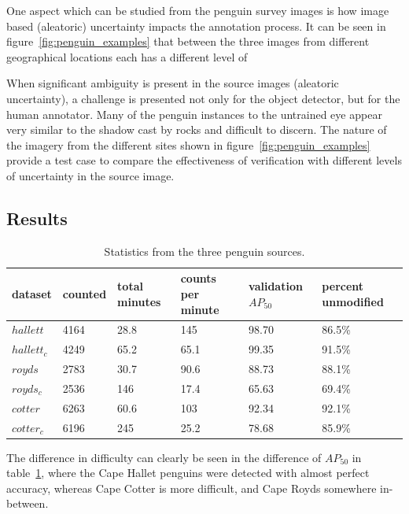 One aspect which can be studied from the penguin survey images is how image based (aleatoric) uncertainty impacts the annotation process. It can be seen in figure~\ref{fig:penguin_examples} that between the three images from different geographical locations each has a different level of 

When significant ambiguity is present in the source images (aleatoric uncertainty), a challenge is presented not only for the object detector, but for the human annotator. Many of the penguin instances to the untrained eye appear very similar to the shadow cast by rocks and difficult to discern. The nature of the imagery from the different sites shown in figure~\ref{fig:penguin_examples} provide a test case to compare the effectiveness of verification with different levels of uncertainty in the source image. 


\subsection{Results}
\label{sec:penguin_results}

\begin{table}[H]
  \centering
    \caption{Statistics from the three penguin sources. }
\begin{tabular}{llllll}
dataset     & counted & total minutes & counts per minute & validation $AP_{50}$ & percent unmodified \\
\toprule
$hallett$   & 4164    & 28.8          & 145               & 98.70     & 86.5\%   \\
$hallett_c$ & 4249    & 65.2          & 65.1              & 99.35     & 91.5\%   \\
$royds$     & 2783    & 30.7          & 90.6              & 88.73     & 88.1\%   \\
$royds_c$   & 2536    & 146           & 17.4              & 65.63     & 69.4\%   \\
$cotter$    & 6263    & 60.6          & 103               & 92.34     & 92.1\%   \\
$cotter_c$  & 6196    & 245           & 25.2              & 78.68     & 85.9\%  \\
\bottomrule
\end{tabular}

\label{fig:penguin_statistics}
\end{table}

The difference in difficulty can clearly be seen in the difference of $AP_{50}$ in table~\ref{fig:penguin_statistics}, where the Cape Hallet penguins were detected with almost perfect accuracy, whereas Cape Cotter is more difficult, and Cape Royds somewhere in-between. 


